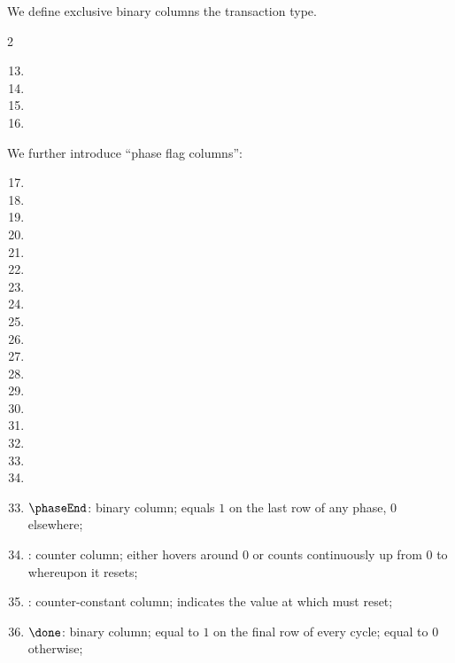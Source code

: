 We define exclusive binary columns the transaction type.
\begin{multicols}{2}
    \begin{enumerate}
	    \setcounter{enumi}{12}
	\item \typeZeroTx{}
	\item \typeOneTx{}
	\item \typeTwoTx{}
	\item \typeFourTx{}
    \end{enumerate}
\end{multicols}
We further introduce ``phase flag columns'':
\begin{enumerate}[resume]
	\setcounter{enumi}{16}
	\item \phaseRlpPrefix{}
	\item \phaseChainId{}
	\item \phaseNonce{}
	\item \phaseGasPrice{}
	\item \phaseGasLimit{}
	\item \phaseTo{}
	\item \phaseValue{}
	\item \phaseData{}
	\item \phaseAccessList{}
	\item \phaseBeta{}
	\item \phaseMaxPriorityFeePerGas{}
	\item \phaseMaxFeePerGas{}
	\item \phaseAuthorizationList
	\item \phaseY{}
	\item \phaseR{}
	\item \phaseS{}
	\item[\vspace{\fill}]
	\item[\vspace{\fill}]
\end{enumerate}
\begin{enumerate}
	\setcounter{enumi}{32}
    \item $\phaseEnd$:
	binary column; equals $1$ on the last row of any phase, $0$ elsewhere;
    \item \ct{}:
	counter column; 
	either hovers around $0$ or counts continuously up from $0$ to \maxCt{} whereupon it resets;
    \item \maxCt:
	counter-constant column;
	indicates the value at which \ct{} must reset;
    \item $\done$:
	binary column; equal to $1$ on the final row of every \ct{} cycle; equal to $0$ otherwise;
\end{enumerate}
